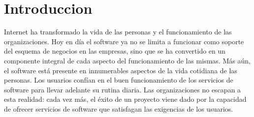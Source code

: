 













\chapter{Introduccion}

Internet ha transformado la vida de las personas y el funcionamiento de las organizaciones. Hoy en día el software ya no se limita a funcionar como soporte del esquema de negocios en las empresas, sino que se ha convertido en un componente integral de cada aspecto del funcionamiento de las mismas. Más aún, el software está presente en innumerables aspectos de la vida cotidiana de las personas. Los usuarios confían en el buen funcionamiento de los servicios de software para llevar adelante su rutina diaria. Las organizaciones no escapan a esta realidad: cada vez más, el éxito de un proyecto viene dado por la capacidad de ofrecer servicios de software que satisfagan las exigencias de los usuarios.

